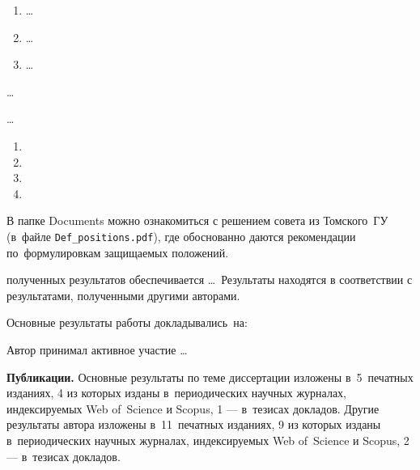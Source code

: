 {\novelty}
\begin{enumerate}[beginpenalty=10000] %
  \item {} \ldots
  \item {} \ldots
  \item {} \ldots
\end{enumerate}

{\influence} \ldots

{\methods} \ldots

{}
\begin{enumerate}[beginpenalty=10000] %
  \item {}
  \item {}
  \item {}
  \item {}
\end{enumerate}
В папке Documents можно ознакомиться с решением совета из Томского~ГУ
(в~файле \verb+Def_positions.pdf+), где обоснованно даются рекомендации
по~формулировкам защищаемых положений.

{\reliability} полученных результатов обеспечивается \ldots \ Результаты находятся в соответствии с результатами, полученными другими авторами.


{\probation}
Основные результаты работы докладывались~на:

{\contribution} Автор принимал активное участие \ldots

\textbf{Публикации.} Основные результаты по теме диссертации изложены в~5~печатных изданиях, 4 из которых изданы в~периодических научных журналах, индексируемых Web of~Science и Scopus, 1 --- в~тезисах докладов. Другие результаты автора изложены в~11~печатных изданиях, 9 из которых изданы в~периодических научных журналах, индексируемых Web of~Science и Scopus, 2 --- в~тезисах докладов.

